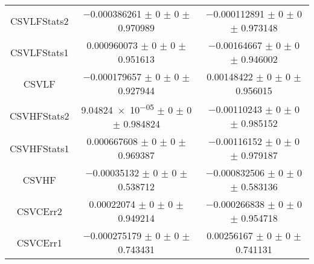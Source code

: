\begin{table}
\begin{tabular}{ccc}
CSVLFStats2 	& \num{-0.000386261} $\pm$ \num{0} $\pm$ \num{0} $\pm$ \num{0.970989} 	& \num{-0.000112891} $\pm$ \num{0} $\pm$ \num{0} $\pm$ \num{0.973148}\\
CSVLFStats1 	& \num{0.000960073} $\pm$ \num{0} $\pm$ \num{0} $\pm$ \num{0.951613} 	& \num{-0.00164667} $\pm$ \num{0} $\pm$ \num{0} $\pm$ \num{0.946002}\\
CSVLF 	& \num{-0.000179657} $\pm$ \num{0} $\pm$ \num{0} $\pm$ \num{0.927944} 	& \num{0.00148422} $\pm$ \num{0} $\pm$ \num{0} $\pm$ \num{0.956015}\\
CSVHFStats2 	& \num{9.04824e-05} $\pm$ \num{0} $\pm$ \num{0} $\pm$ \num{0.984824} 	& \num{-0.00110243} $\pm$ \num{0} $\pm$ \num{0} $\pm$ \num{0.985152}\\
CSVHFStats1 	& \num{0.000667608} $\pm$ \num{0} $\pm$ \num{0} $\pm$ \num{0.969387} 	& \num{-0.00116152} $\pm$ \num{0} $\pm$ \num{0} $\pm$ \num{0.979187}\\
CSVHF 	& \num{-0.00035132} $\pm$ \num{0} $\pm$ \num{0} $\pm$ \num{0.538712} 	& \num{-0.000832506} $\pm$ \num{0} $\pm$ \num{0} $\pm$ \num{0.583136}\\
CSVCErr2 	& \num{0.00022074} $\pm$ \num{0} $\pm$ \num{0} $\pm$ \num{0.949214} 	& \num{-0.000266838} $\pm$ \num{0} $\pm$ \num{0} $\pm$ \num{0.954718}\\
CSVCErr1 	& \num{-0.000275179} $\pm$ \num{0} $\pm$ \num{0} $\pm$ \num{0.743431} 	& \num{0.00256167} $\pm$ \num{0} $\pm$ \num{0} $\pm$ \num{0.741131}\\
\bottomrule
\end{tabular}
\end{table}